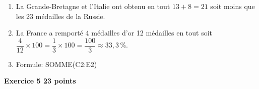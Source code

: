 \documentclass[10pt]{article}
\begin{document}
\begin{enumerate}
\item %
La Grande-Bretagne et l'Italie ont obtenu en tout $13 + 8 = 21$ soit moins que les 23 médailles de la Russie.
\item %
La France a remporté 4 médailles d'or 12 médailles en tout soit $\dfrac{4}{12} \times 100 = \dfrac{1}{3} \times 100 = \dfrac{100}{3} \approx 33,3\,\%$.
\item %
Formule: SOMME(C2:E2)

\end{enumerate}

\bigskip

\textbf{Exercice 5 \hfill 23 points}

\medskip

%
%
%
%
%
%
%
%
\end{document}
